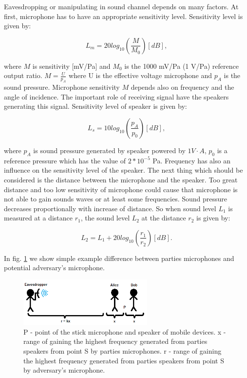 \documentclass[11pt,titlepage]{article}
\theoremstyle{plain}
\begin{document}
\vspace{5mm}

Eavesdropping or manipulating in sound channel depends on many factors.
At first, microphone has to have an appropriate sensitivity level. Sensitivity level is given by:

\begin{equation}
	L_m = 20 log_{10}\left(\frac{M}{M_0}\right)[dB],
\end{equation}

where $M$ is sensitivity [mV/Pa] and $M_0$ is the 1000 mV/Pa (1 V/Pa) reference output ratio. $M = \frac{U}{p_A}$ where U is the effective voltage microphone and $p_A$ is the sound pressure. Microphone sensitivity $M$ depends also on frequency and the angle of incidence. The important role of receiving signal have the speakers generating this signal. Sensitivity level of speaker is given by: 

\begin{equation}
	L_s = 10 log_{10}\left(\frac{p_A}{p_0}\right)[dB],
\end{equation}

where $p_A$ is sound pressure generated by speaker powered by $1V \cdot A$, $p_0$ is a reference pressure which has the value of $2*10^{-5}$ Pa. Frequency has also an influence on the sensitivity level of the speaker. The next thing which should be considered is the distance between the microphone and the speaker. Too great distance and too low sensitivity of microphone could cause that microphone is not able to gain sounds waves or at least some frequencies. Sound pressure decreases proportionally with increase of distance. So when sound level $L_{1}$ is measured at a distance $r_1$, the sound level $L_2$ at the distance $r_2$ is given by:

\begin{equation}
	L_2 = L_1 + 20 log_{10} \left(\frac{r_1}{r_2}\right)[dB].
\end{equation}

In fig. \ref{fig:F30} we show simple example difference between parties microphones and potential adversary's microphone.

\begin{figure}[H]
	\centering
	\includegraphics[width=0.6\textwidth]{img/adversary}
	\caption{P - point of the stick microphone and speaker of mobile devices. x - range of gaining the highest frequency generated from parties speakers from point S by parties microphones. r - range of gaining the highest frequency generated from parties speakers from point S by adversary's microphone.}
	\label{fig:F30}
\end{figure}
\end{document}
